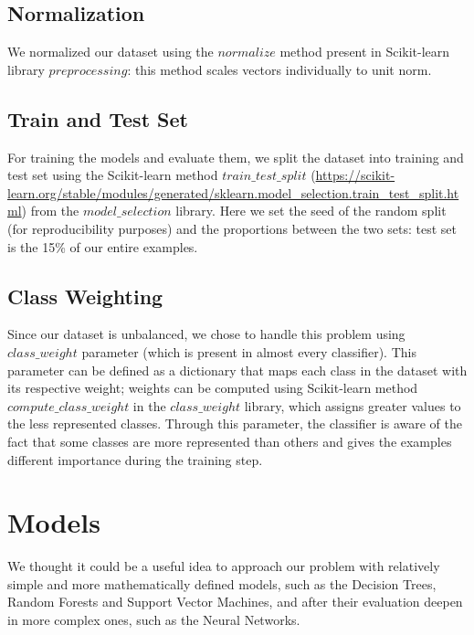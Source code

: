 \documentclass[12pt]{article}
\begin{document}
\subsection{Normalization}
We normalized our dataset using the $normalize$ method present in Scikit-learn library $preprocessing$: this method scales vectors individually to unit norm. 


\subsection{Train and Test Set}

For training the models and evaluate them, we split the dataset into training and test set using the Scikit-learn method $train\_test\_split$ (\url{https://scikit-learn.org/stable/modules/generated/sklearn.model_selection.train_test_split.html}) from the $model\_selection$ library. Here we set the seed of the random split (for reproducibility purposes) and the proportions between the two sets: test set is the 15\% of our entire examples.


\subsection{Class Weighting}
Since our dataset is unbalanced, we chose to handle this problem using $class\_weight$ parameter (which is present in almost every classifier). This parameter can be defined as a dictionary that maps each class in the dataset with its respective weight; weights can be computed using Scikit-learn method $compute\_class\_weight$ in the $class\_weight$ library, which assigns greater values to the less represented classes. Through this parameter, the classifier is aware of the fact that some classes are more represented than others and gives the examples different importance during the training step.

\newpage
\section{Models}
We thought it could be a useful idea to approach our problem with relatively simple and more mathematically defined models, such as the Decision Trees, Random Forests and Support Vector Machines, and after their evaluation deepen in more complex ones, such as the Neural Networks. 
\end{document}
